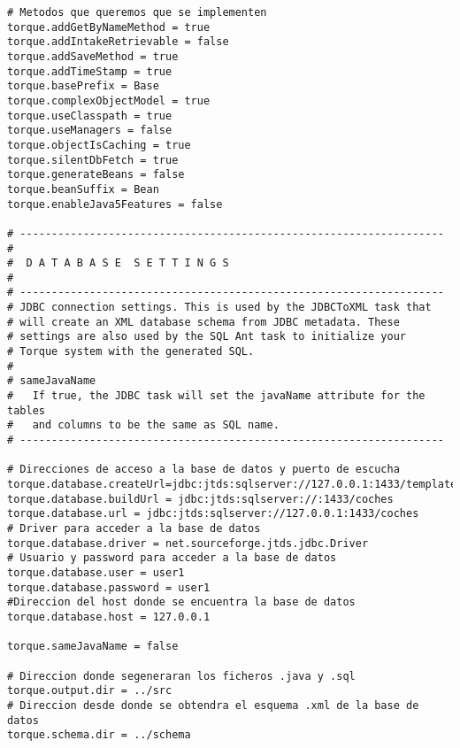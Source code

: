 \begin{lstlisting}
# Metodos que queremos que se implementen
torque.addGetByNameMethod = true
torque.addIntakeRetrievable = false
torque.addSaveMethod = true
torque.addTimeStamp = true
torque.basePrefix = Base
torque.complexObjectModel = true
torque.useClasspath = true
torque.useManagers = false
torque.objectIsCaching = true
torque.silentDbFetch = true
torque.generateBeans = false
torque.beanSuffix = Bean
torque.enableJava5Features = false

# -------------------------------------------------------------------
#
#  D A T A B A S E  S E T T I N G S
#
# -------------------------------------------------------------------
# JDBC connection settings. This is used by the JDBCToXML task that
# will create an XML database schema from JDBC metadata. These
# settings are also used by the SQL Ant task to initialize your
# Torque system with the generated SQL.
#
# sameJavaName
#   If true, the JDBC task will set the javaName attribute for the tables
#   and columns to be the same as SQL name.
# -------------------------------------------------------------------

# Direcciones de acceso a la base de datos y puerto de escucha
torque.database.createUrl=jdbc:jtds:sqlserver://127.0.0.1:1433/template1/coches
torque.database.buildUrl = jdbc:jtds:sqlserver://:1433/coches
torque.database.url = jdbc:jtds:sqlserver://127.0.0.1:1433/coches
# Driver para acceder a la base de datos
torque.database.driver = net.sourceforge.jtds.jdbc.Driver
# Usuario y password para acceder a la base de datos
torque.database.user = user1
torque.database.password = user1
#Direccion del host donde se encuentra la base de datos
torque.database.host = 127.0.0.1

torque.sameJavaName = false

# Direccion donde segeneraran los ficheros .java y .sql
torque.output.dir = ../src
# Direccion desde donde se obtendra el esquema .xml de la base de datos
torque.schema.dir = ../schema
\end{lstlisting}